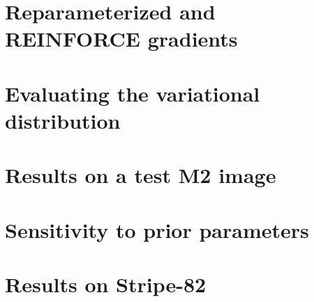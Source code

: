 \documentclass[12pt]{article}
\begin{document}
\section{Reparameterized and REINFORCE gradients}
\label{sec:reparam_details}


\section{Evaluating the variational distribution}
\label{sec:eval_var_distr}


\section{Results on a test M2 image}
\label{sec:test_m2}



\section{Sensitivity to prior parameters}
\label{sec:prior_sensitivity}



\section{Results on Stripe-82}
\label{sec:results_sparse_field}

\end{document}
